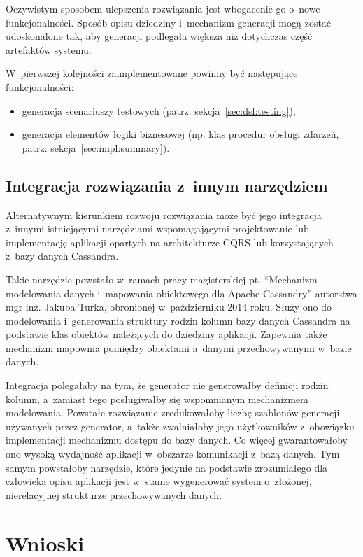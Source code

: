 Oczywistym sposobem ulepszenia rozwiązania jest wbogacenie go o~nowe funkcjonalności.
Sposób opisu dziedziny i~mechanizm generacji mogą zostać udoskonalone tak, aby generacji podlegała większa niż dotychczas część artefaktów systemu.

W~pierwszej kolejności zaimplementowane powinny być następujące funkcjonalności:

\begin{itemize}
 \item generacja scenariuszy testowych (patrz: sekcja~\ref{sec:dsl:testing}),
 \item generacja elementów logiki biznesowej (np. klas procedur obsługi zdarzeń, patrz: sekcja~\ref{sec:impl:summary}).
\end{itemize}


\subsection{Integracja rozwiązania z~innym narzędziem}

Alternatywnym kierunkiem rozwoju rozwiązania może być jego integracja z~innymi istniejącymi narzędziami wspomagającymi projektowanie lub implementację aplikacji opartych na architekturze CQRS lub korzystających z~bazy danych Cassandra.

Takie narzędzie powstało w~ramach pracy magisterskiej pt. ``Mechanizm modelowania danych i~mapowania obiektowego dla Apache Cassandry'' autorstwa mgr inż. Jakuba Turka, obronionej w~październiku 2014 roku.
Służy ono do modelowania i~generowania struktury rodzin kolumn bazy danych Cassandra na podstawie klas obiektów należących do dziedziny aplikacji.
Zapewnia także mechanizm mapownia pomiędzy obiektami a~danymi przechowywanymi w~bazie danych.

Integracja polegałaby na tym, że generator nie generowałby definicji rodzin kolumn, a~zamiast tego posługiwałby się wspomnianym mechanizmem modelowania.
Powstałe rozwiązanie zredukowałoby liczbę szablonów generacji używanych przez generator, a~także zwalniałoby jego użytkowników z~obowiązku implementacji mechanizmu dostępu do bazy danych.
Co więcej gwarantowałoby ono wysoką wydajność aplikacji w~obszarze komunikacji z~bazą danych.
Tym samym powstałoby narzędzie, które jedynie na podstawie zrozumiałego dla człowieka opisu aplikacji jest w~stanie wygenerować system o~złożonej, nierelacyjnej strukturze przechowywanych danych.



\section{Wnioski}

